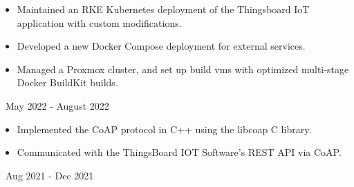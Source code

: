\documentclass[11pt,letterpaper,ragged2e]{altacv}
\begin{document}

\begin{fullwidth}
\makecvheader
\end{fullwidth}





{
\begin{itemize}
    \item Maintained an RKE Kubernetes deployment of the Thingsboard IoT application with custom modifications.
    \item Developed a new Docker Compose deployment for external services.
    \item Managed a Proxmox cluster, and set up build vms with optimized multi-stage Docker BuildKit builds.
\end{itemize}
}
{\faCalendar\, May 2022 - August 2022}
{
}

{
\begin{itemize}
    \item Implemented the CoAP protocol in C++ using the libcoap C library.
    \item Communicated with the ThingsBoard IOT Software's REST API via CoAP. 
\end{itemize}
}
{\faCalendar\, Aug 2021 - Dec 2021}
{
}
\end{document}

